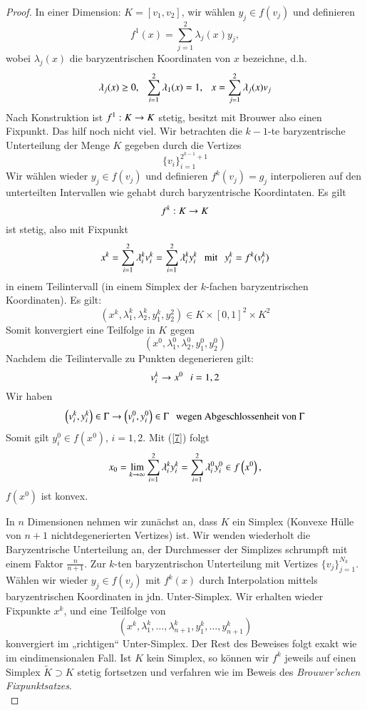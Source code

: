 \begin{proof}
    In einer Dimension: $K=[v_1,v_2]$, wir wählen $y_j\in f(v_j)$ und definieren
    \[
        f^1(x)=\sum_{j=1}^{2} \lambda_j(x)y_j,
    \]
    wobei $\lambda _j(x)$ die baryzentrischen Koordinaten von $x$ bezeichne, d.h.
    \[
        \lambda_j(x)\geq 0, \hspace{.25cm} \sum_{i=1}^2 \lambda_1(x)=1,\hspace{.25cm} x=\sum_{j=1}^2 \lambda_j(x)v_j
    \]
    Nach Konstruktion ist $f^1:K\rightarrow K$ stetig, besitzt mit Brouwer also einen Fixpunkt. Das hilf
    noch nicht viel. Wir betrachten die $k-1$-te baryzentrische Unterteilung der Menge $K$ gegeben
    durch die Vertizes 
    \[
        \{v_i\}_{i=1}^{2^{k-1}+1}
    \]
    Wir wählen wieder $y_j\in f(v_j)$ und definieren $f^k(v_j)=g_j$ interpolieren auf den unterteilten
    Intervallen wie gehabt durch baryzentrische Koordintaten. Es gilt
    \[
        f^k: K\rightarrow K
    \] 
    ist stetig, also mit Fixpunkt
    \begin{align}\label{7}
        x^k=\sum_{i=1}^2 \lambda_i^kv_i^k= \sum_{i=1}^2 \lambda_i^ky_i^k \hspace{.25cm} \text{mit} \hspace{.25cm} 
        y_i^k=f^k(v_i^k)
    \end{align}
    in einem Teilintervall  (in einem Simplex der $k$-fachen baryzentrischen Koordinaten). Es gilt:
    \[
        \left(x^k,\lambda_1^k,\lambda_2^k,y_1^k,y_2^2\right)\in K\times[0,1]^2\times K^2
    \]
    Somit konvergiert eine Teilfolge in $K$ gegen
    \[
        \left(x^0,\lambda_1^0,\lambda_2^0,y_1^0,y_2^0\right)
    \]
    Nachdem die Teilintervalle zu Punkten degenerieren gilt:
    \[
        v_i^k\rightarrow x^0 \hspace{.25cm} i=1,2
    \]
    Wir haben 
    \[
        \left(v_i^k,y_i^k\right)\in\Gamma\rightarrow \left(v_i^0,y_i^0\right)\in \Gamma \hspace{.25cm} 
        \text{wegen Abgeschlossenheit von }\Gamma
    \]
    Somit gilt $y_i^0\in f(x^0)$, $i=1,2$. Mit (\ref{7}) folgt
    \[
        x_0 =\lim_{k\rightarrow\infty} \sum_{i=1}^2\lambda_i^ky_i^k=\sum_{i=1}^2 \lambda^0_iy_i^0 
        \in f\left(x^0\right),
    \]
    $f\left(x^0\right)$ ist konvex. 

    In $n$ Dimensionen nehmen wir zunächst an, dass $K$ ein Simplex (Konvexe Hülle von $n+1$
    nichtdegenerierten Vertizes) ist. Wir wenden wiederholt die Baryzentrische Unterteilung an,
    der Durchmesser der Simplizes schrumpft mit einem Faktor $\frac{n}{n+1}$.
    Zur $k$-ten baryzentrischon Unterteilung mit Vertizes $\{v_j\}_{j=1}^{N_k}$. Wählen wir wieder
    $y_j\in f(v_j)$ mit $f^k(x)$ durch Interpolation mittels baryzentrischen Koordinaten in jdn.
    Unter-Simplex. Wir erhalten wieder Fixpunkte $x^k$, und eine Teilfolge von
    \[
        (x^k,\lambda_1^k,…,\lambda_{n+1}^k,y_1^k,…,y_{n+1}^k)
    \]
    konvergiert im „richtigen“ Unter-Simplex. Der Rest des Beweises folgt exakt wie im eindimensionalen
    Fall. Ist $K$ kein Simplex, so können wir $f^k$ jeweils auf einen Simplex $\tilde K\supset K$ stetig
    fortsetzen und verfahren wie im Beweis des \textit{Brouwer'schen Fixpunktsatzes}.
    \[ \]
\end{proof}

